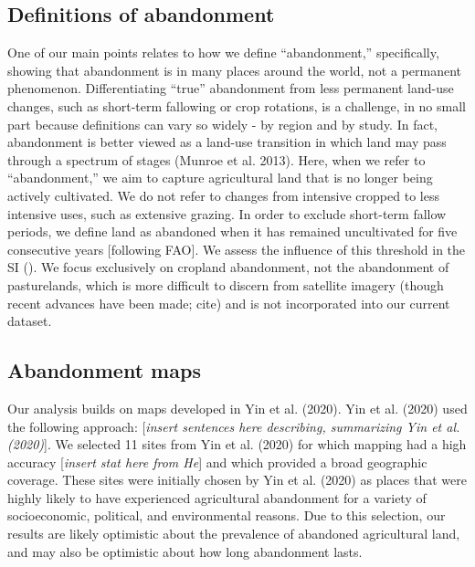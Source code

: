 \documentclass[
]{article}
\begin{document}
\hypertarget{definitions-of-abandonment}{%
\subsection{Definitions of abandonment}\label{definitions-of-abandonment}}

One of our main points relates to how we define ``abandonment,'' specifically, showing that abandonment is in many places around the world, not a permanent phenomenon.
Differentiating ``true'' abandonment from less permanent land-use changes, such as short-term fallowing or crop rotations, is a challenge, in no small part because definitions can vary so widely - by region and by study.
In fact, abandonment is better viewed as a land-use transition in which land may pass through a spectrum of stages (Munroe et al. 2013).
Here, when we refer to ``abandonment,'' we aim to capture agricultural land that is no longer being actively cultivated.
We do not refer to changes from intensive cropped to less intensive uses, such as extensive grazing.
In order to exclude short-term fallow periods, we define land as abandoned when it has remained uncultivated for five consecutive years {[}following FAO{]}.
We assess the influence of this threshold in the SI ().
We focus exclusively on cropland abandonment, not the abandonment of pasturelands, which is more difficult to discern from satellite imagery (though recent advances have been made; cite) and is not incorporated into our current dataset.

\hypertarget{abandonment-maps}{%
\subsection{Abandonment maps}\label{abandonment-maps}}

Our analysis builds on maps developed in Yin et al. (2020). Yin et al. (2020) used the following approach: {[}\emph{insert sentences here describing, summarizing Yin et al. (2020)}{]}.
We selected 11 sites from Yin et al. (2020) for which mapping had a high accuracy {[}\emph{insert stat here from He}{]} and which provided a broad geographic coverage.
These sites were initially chosen by Yin et al. (2020) as places that were highly likely to have experienced agricultural abandonment for a variety of socioeconomic, political, and environmental reasons.
Due to this selection, our results are likely optimistic about the prevalence of abandoned agricultural land, and may also be optimistic about how long abandonment lasts.
\end{document}
